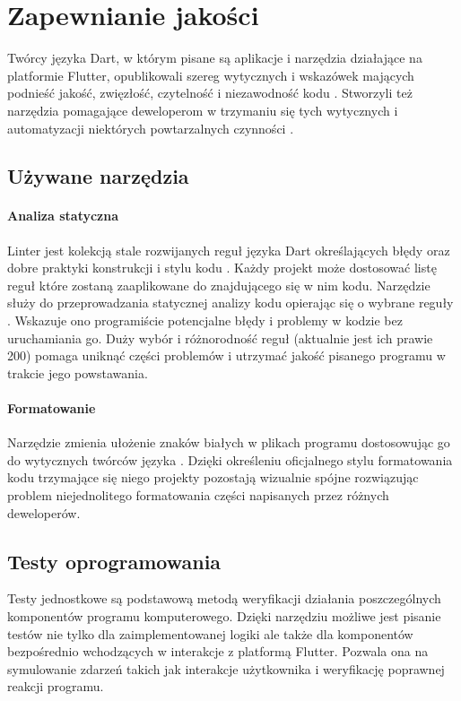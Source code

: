 \section{Zapewnianie jakości}
Twórcy języka Dart, w którym pisane są aplikacje i narzędzia działające na platformie Flutter, opublikowali szereg wytycznych i wskazówek mających podnieść jakość, zwięzłość, czytelność i niezawodność kodu \cite{Effective_Dart}. Stworzyli też narzędzia pomagające deweloperom w trzymaniu się tych wytycznych i automatyzacji niektórych powtarzalnych czynności \cite{Dart_SDK}.

\subsection{Używane narzędzia}

\paragraph{Analiza statyczna}
\label{par:static_analysis}
Linter jest kolekcją stale rozwijanych reguł języka Dart określających błędy oraz dobre praktyki konstrukcji i stylu kodu \cite{Dart_Lints}. Każdy projekt  może dostosować listę reguł które zostaną zaaplikowane do znajdującego się w nim kodu. Narzędzie  służy do przeprowadzania statycznej analizy kodu opierając się o wybrane reguły \cite{Dart_Analyze}. Wskazuje ono programiście potencjalne błędy i problemy w kodzie bez uruchamiania go. Duży wybór i różnorodność reguł (aktualnie jest ich prawie 200) pomaga uniknąć części problemów i utrzymać jakość pisanego programu w trakcie jego powstawania.

\paragraph{Formatowanie}
\label{par:dart_format}
Narzędzie  zmienia ułożenie znaków białych w plikach programu dostosowując go do wytycznych twórców języka \cite{Dart_Format}. Dzięki określeniu oficjalnego stylu formatowania kodu trzymające się niego projekty pozostają wizualnie spójne rozwiązując problem niejednolitego formatowania części napisanych przez różnych deweloperów.

\subsection{Testy oprogramowania}
Testy jednostkowe są podstawową metodą weryfikacji działania poszczególnych komponentów programu komputerowego. Dzięki narzędziu  możliwe jest pisanie testów nie tylko dla zaimplementowanej logiki ale także dla komponentów bezpośrednio wchodzących w interakcje z platformą Flutter. Pozwala ona na symulowanie zdarzeń takich jak interakcje użytkownika i weryfikację poprawnej reakcji programu. 
 
